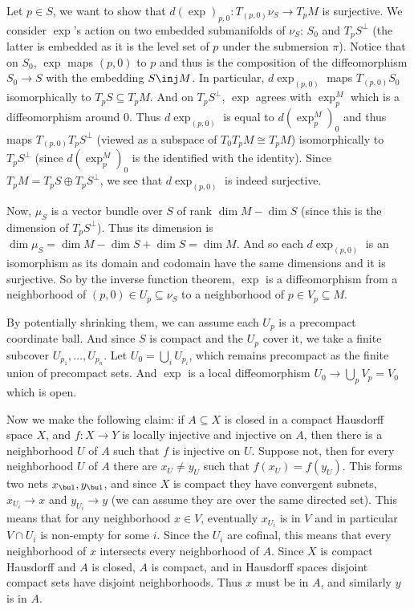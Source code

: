     Let $p\in S$, we want to show that $d(\exp)_{p,0}\colon T_{(p,0)}\nu_S\to T_pM$ is surjective.
    We consider $\exp$'s action on two embedded submanifolds of $\nu_S$: $S_0$ and $T_pS^\perp$ (the latter is embedded as it is the level set of $p$ under the submersion $\pi$).
    Notice that on $S_0$, $\exp$ maps $(p,0)$ to $p$ and thus is the composition of the diffeomorphism $S_0\to S$ with the embedding $S\inj M$.
    In particular, $d\exp_{(p,0)}$ maps $T_{(p,0)}S_0$ isomorphically to $T_pS\subseteq T_pM$.
    And on $T_pS^\perp$, $\exp$ agrees with $\exp^M_p$ which is a diffeomorphism around $0$.
    Thus $d\exp_{(p,0)}$ is equal to $d(\exp^M_p)_0$ and thus maps $T_{(p,0)}T_pS^\perp$ (viewed as a subspace of $T_0T_pM\cong T_pM$) isomorphically to $T_pS^\perp$ (since $d(\exp^M_p)_0$ is the identified
    with the identity).
    Since $T_pM=T_pS\oplus T_pS^\perp$, we see that $d\exp_{(p,0)}$ is indeed surjective.

    Now, $\mu_S$ is a vector bundle over $S$ of rank $\dim M-\dim S$ (since this is the dimension of $T_pS^\perp$).
    Thus its dimension is $\dim\mu_S=\dim M-\dim S+\dim S=\dim M$.
    And so each $d\exp_{(p,0)}$ is an isomorphism as its domain and codomain have the same dimensions and it is surjective.
    So by the inverse function theorem, $\exp$ is a diffeomorphism from a neighborhood of $(p,0)\in U_p\subseteq\nu_S$ to a neighborhood of $p\in V_p\subseteq M$.

    By potentially shrinking them, we can assume each $U_p$ is a precompact coordinate ball.
    And since $S$ is compact and the $U_p$ cover it, we take a finite subcover $U_{p_1},\dots,U_{p_n}$.
    Let $U_0=\bigcup_iU_{p_i}$, which remains precompact as the finite union of precompact sets.
    And $\exp$ is a local diffeomorphism $U_0\to\bigcup_pV_p=V_0$ which is open.

    Now we make the following claim: if $A\subseteq X$ is closed in a compact Hausdorff space $X$, and $f\colon X\to Y$ is locally injective and injective on $A$,
    then there is a neighborhood $U$ of $A$ such that $f$ is injective on $U$.
    Suppose not, then for every neighborhood $U$ of $A$ there are $x_U\neq y_U$ such that $f(x_U)=f(y_U)$.
    This forms two nets $x_\bul,y_\bul$, and since $X$ is compact they have convergent subnets, $x_{U_i}\to x$ and $y_{U_i}\to y$ (we can assume they are over the same directed set).
    This means that for any neighborhood $x\in V$, eventually $x_{U_i}$ is in $V$ and in particular $V\cap U_i$ is non-empty for some $i$.
    Since the $U_i$ are cofinal, this means that every neighborhood of $x$ intersects every neighborhood of $A$.
    Since $X$ is compact Hausdorff and $A$ is closed, $A$ is compact, and in Hausdorff spaces disjoint compact sets have disjoint neighborhoods.
    Thus $x$ must be in $A$, and similarly $y$ is in $A$.

